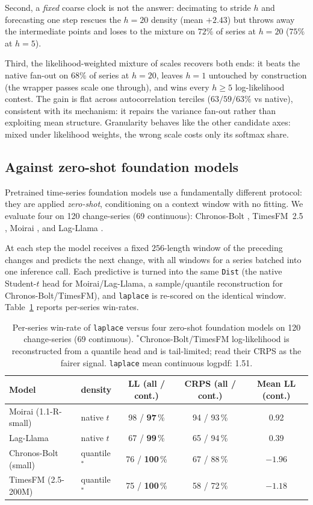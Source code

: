\documentclass[article]{jss}
\providecommand{\code}[1]{\texttt{#1}}
\begin{document}
Second, a \emph{fixed} coarse clock is not the answer:
decimating to stride $h$ and forecasting one step rescues the $h=20$ density
(mean $+2.43$) but throws away the intermediate points and loses to the mixture
on $72\%$ of series at $h=20$ ($75\%$ at $h=5$).

Third, the likelihood-weighted
mixture of scales recovers both ends: it beats the native fan-out on $68\%$ of
series at $h=20$, leaves $h=1$ untouched by construction (the wrapper passes
scale one through), and wins every $h\ge5$ log-likelihood contest. The gain is flat across autocorrelation terciles ($63/59/63\%$ vs
native), consistent with its mechanism: it repairs the variance fan-out rather
than exploiting mean structure. Granularity behaves like the other candidate
axes: mixed under likelihood weights, the wrong scale costs only its softmax
share.

\subsection{Against zero-shot foundation models} \label{sec:foundation}

Pretrained time-series foundation models use a fundamentally different protocol:
they are applied \emph{zero-shot}, conditioning on a context window with no
fitting. We evaluate four on 120 change-series (69 continuous):
Chronos-Bolt \citep{ansari2024chronos}, TimesFM~2.5 \citep{das2024timesfm},
Moirai \citep{woo2024moirai}, and Lag-Llama \citep{rasul2023lagllama}.

At each step the model receives a fixed
$256$-length window of the preceding changes and predicts the next change, with
all windows for a series batched into one inference call. Each predictive is
turned into the same \code{Dist} (the native Student-$t$ head for
Moirai/Lag-Llama, a sample/quantile reconstruction for Chronos-Bolt/TimesFM),
and \code{laplace} is re-scored on the identical window. Table~\ref{tab:foundation}
reports per-series win-rates.

\begin{table}[t!]
\centering
\begin{tabular}{llccc}
\toprule
Model & density & LL (all / cont.) & CRPS (all / cont.) & Mean LL (cont.) \\
\midrule
Moirai (1.1-R-small)  & native $t$    & 98 / \textbf{97}\,\% & 94 / 93\,\% & 0.92 \\
Lag-Llama             & native $t$    & 67 / \textbf{99}\,\% & 65 / 94\,\% & 0.39 \\
Chronos-Bolt (small)  & quantile$^{*}$ & 76 / \textbf{100}\,\% & 67 / 88\,\% & $-1.96$ \\
TimesFM (2.5-200M)    & quantile$^{*}$ & 75 / \textbf{100}\,\% & 58 / 72\,\% & $-1.18$ \\
\bottomrule
\end{tabular}
\caption{Per-series win-rate of \code{laplace} versus four zero-shot foundation
models on 120 change-series (69 continuous). $^{*}$Chronos-Bolt/TimesFM
log-likelihood is reconstructed from a quantile head and is tail-limited; read
their CRPS as the fairer signal. \code{laplace} mean continuous logpdf:
1.51.}
\label{tab:foundation}
\end{table}
\end{document}
